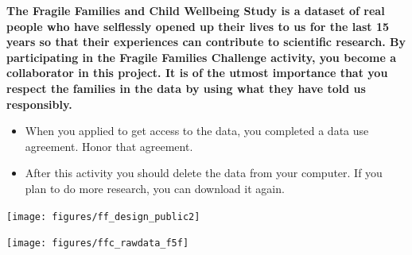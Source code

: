 \documentclass[aspectratio=169]{beamer}
\begin{document}
\begin{frame}

\textbf{The Fragile Families and Child Wellbeing Study is a dataset of real people who have selflessly opened up their lives to us for the last 15 years so that their experiences can contribute to scientific research. By participating in the Fragile Families Challenge activity, you become a collaborator in this project. It is of the utmost importance that you respect the families in the data by using what they have told us responsibly.}

\end{frame}
\begin{frame}

\begin{itemize}
\item When you applied to get access to the data, you completed a data use agreement. Honor that agreement.
\pause
\item After this activity you should delete the data from your computer. If you plan to do more research, you can download it again.
\end{itemize}

\end{frame}
\begin{frame}

\begin{center}
\texttt{[image: figures/ff\_design\_public2]}
\end{center}

\end{frame}
\begin{frame}

\begin{center}
\texttt{[image: figures/ffc\_rawdata\_f5f]}
\end{center}

\end{frame}
%
%
%
\end{document}
